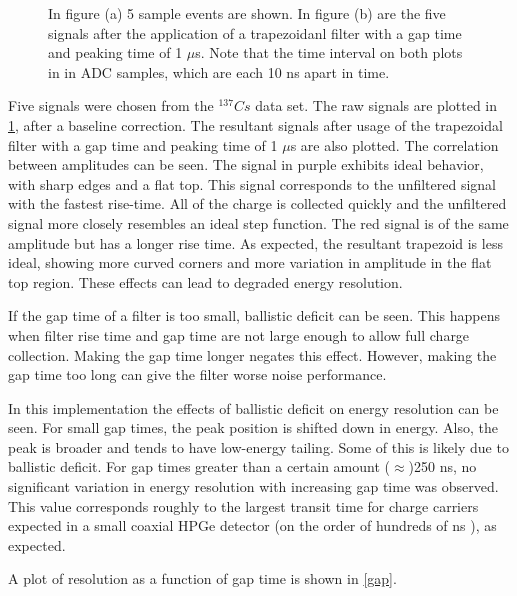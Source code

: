 \begin{figure}%
    \centering
    \quad
    \caption{In figure (a) 5 sample events are shown. In figure (b) are the five signals after the application of a trapezoidanl filter with a gap time and peaking time of 1 $\mu$s. Note that the time interval on both plots in in ADC samples, which are each 10 ns apart in time.}%
    \label{fig:signals}%
\end{figure}


Five signals were chosen from the ${}^{137}{Cs}$ data set. The raw signals are plotted in \ref{fig:signals}, after a baseline correction. The resultant signals after usage of the trapezoidal filter with a gap time and peaking time of 1 $\mu$s are also plotted. The correlation between amplitudes can be seen. The signal in purple exhibits ideal behavior, with sharp edges and a flat top. This signal corresponds to the unfiltered signal with the fastest rise-time. All of the charge is collected quickly and the unfiltered signal more closely resembles an ideal step function. The red signal is of the same amplitude but has a longer rise time. As expected, the resultant trapezoid is less ideal, showing more curved corners and more variation in amplitude in the flat top region. These effects can lead to degraded energy resolution.

If the gap time of a filter is too small, ballistic deficit can be seen. This happens when filter rise time and gap time are not large enough to allow full charge collection. Making the gap time longer negates this effect. However, making the gap time too long can give the filter worse noise performance. 

In this implementation the effects of ballistic deficit on energy resolution can be seen. For small gap times, the peak position is shifted down in energy. Also, the peak is broader and tends to have low-energy tailing. Some of this is likely due to ballistic deficit. For gap times greater than a certain amount ($\approx$)250 ns, no significant variation in energy resolution with increasing gap time was observed. This value corresponds roughly to the largest transit time for charge carriers expected in a small coaxial HPGe detector (on the order of hundreds of ns \cite{Knoll} ), as expected.

A plot of resolution as a function of gap time is shown in \ref{gap}.

